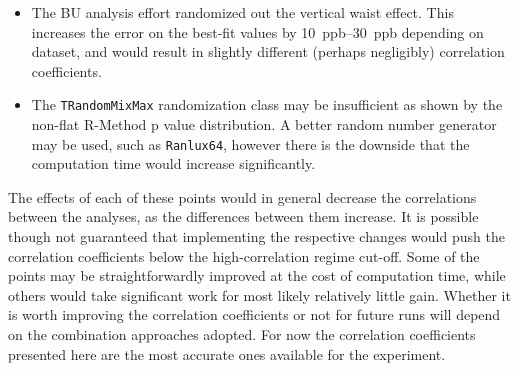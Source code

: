 \begin{itemize}
	\item{The BU analysis effort randomized out the vertical waist effect. This increases the error on the best-fit \R values by \SIrange{10}{30}{ppb} depending on dataset, and would result in slightly different (perhaps negligibly) correlation coefficients.}
	\item{The \texttt{TRandomMixMax} randomization class may be insufficient as shown by the non-flat R-Method p value distribution. A better random number generator may be used, such as \texttt{Ranlux64}, however there is the downside that the computation time would increase significantly.}
\end{itemize}
The effects of each of these points would in general decrease the correlations between the analyses, as the differences between them increase. It is possible though not guaranteed that implementing the respective changes would push the correlation coefficients below the high-correlation regime cut-off. Some of the points may be straightforwardly improved at the cost of computation time, while others would take significant work for most likely relatively little gain. Whether it is worth improving the correlation coefficients or not for future runs will depend on the combination approaches adopted. For now the correlation coefficients presented here are the most accurate ones available for the experiment.


